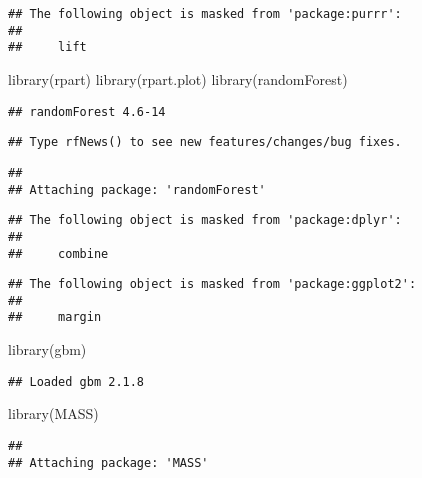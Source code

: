 \documentclass[
]{article}
\newenvironment{Shaded}{\begin{snugshade}}{\end{snugshade}}
\newcommand{\FunctionTok}[1]{\textcolor[rgb]{0.00,0.00,0.00}{#1}}
\newcommand{\NormalTok}[1]{#1}
\begin{document}
\begin{verbatim}
## The following object is masked from 'package:purrr':
## 
##     lift
\end{verbatim}

\begin{Shaded}
\begin{Highlighting}[]
\FunctionTok{library}\NormalTok{(rpart)}
\FunctionTok{library}\NormalTok{(rpart.plot)}
\FunctionTok{library}\NormalTok{(randomForest)}
\end{Highlighting}
\end{Shaded}

\begin{verbatim}
## randomForest 4.6-14
\end{verbatim}

\begin{verbatim}
## Type rfNews() to see new features/changes/bug fixes.
\end{verbatim}

\begin{verbatim}
## 
## Attaching package: 'randomForest'
\end{verbatim}

\begin{verbatim}
## The following object is masked from 'package:dplyr':
## 
##     combine
\end{verbatim}

\begin{verbatim}
## The following object is masked from 'package:ggplot2':
## 
##     margin
\end{verbatim}

\begin{Shaded}
\begin{Highlighting}[]
\FunctionTok{library}\NormalTok{(gbm)}
\end{Highlighting}
\end{Shaded}

\begin{verbatim}
## Loaded gbm 2.1.8
\end{verbatim}

\begin{Shaded}
\begin{Highlighting}[]
\FunctionTok{library}\NormalTok{(MASS)}
\end{Highlighting}
\end{Shaded}

\begin{verbatim}
## 
## Attaching package: 'MASS'
\end{verbatim}
\end{document}
